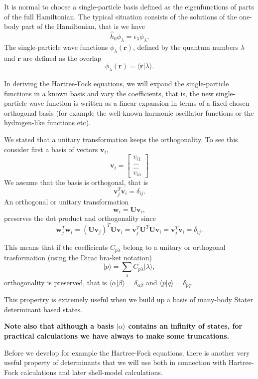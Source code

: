 It is normal to choose a single-particle basis defined as the eigenfunctions
of parts of the full Hamiltonian. The typical situation consists of the solutions of the one-body part of the Hamiltonian, that is we have
\[
\hat{h}_0\phi_{\lambda}=\epsilon_{\lambda}\phi_{\lambda}.
\]
The single-particle wave functions $\phi_{\lambda}(\mathbf{r})$, defined by the quantum numbers $\lambda$ and $\mathbf{r}$
are defined as the overlap 
\[
   \phi_{\lambda}(\mathbf{r})  = \langle \mathbf{r} | \lambda \rangle .
\]

In deriving the Hartree-Fock equations, we  will expand the single-particle functions in a known basis  and vary the coefficients, 
that is, the new single-particle wave function is written as a linear expansion
in terms of a fixed chosen orthogonal basis (for example the well-known harmonic oscillator functions or the hydrogen-like functions etc).

We stated that a unitary transformation keeps the orthogonality. To see this consider first a basis of vectors $\mathbf{v}_i$,
\[
\mathbf{v}_i = \begin{bmatrix} v_{i1} \\ \dots \\ \dots \\v_{in} \end{bmatrix}
\]
We assume that the basis is orthogonal, that is 
\[
\mathbf{v}_j^T\mathbf{v}_i = \delta_{ij}.
\]
An orthogonal or unitary transformation
\[
\mathbf{w}_i=\mathbf{U}\mathbf{v}_i,
\]
preserves the dot product and orthogonality since
\[
\mathbf{w}_j^T\mathbf{w}_i=(\mathbf{U}\mathbf{v}_j)^T\mathbf{U}\mathbf{v}_i=\mathbf{v}_j^T\mathbf{U}^T\mathbf{U}\mathbf{v}_i= \mathbf{v}_j^T\mathbf{v}_i = \delta_{ij}.
\]

This means that if the coefficients $C_{p\lambda}$ belong to a unitary or orthogonal trasformation (using the Dirac bra-ket notation)
\[
\vert p\rangle  = \sum_{\lambda} C_{p\lambda}\vert\lambda\rangle,
\]
orthogonality is preserved, that is $\langle \alpha \vert \beta\rangle = \delta_{\alpha\beta}$
and $\langle p \vert q\rangle = \delta_{pq}$. 

This propertry is extremely useful when we build up a basis of many-body Stater determinant based states. 

\textbf{Note also that although a basis $\vert \alpha\rangle$ contains an infinity of states, for practical calculations we have always to make some truncations.} 

Before we develop for example the Hartree-Fock equations, there is another very useful property of determinants that we will use both in connection with Hartree-Fock calculations and later shell-model calculations.  

